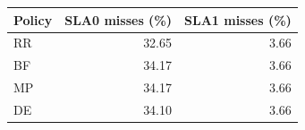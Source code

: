 \begin{tabular}{lrr}
\toprule
Policy & SLA0 misses (\%) & SLA1 misses (\%) \\
\midrule
RR & 32.65 & 3.66 \\
BF & 34.17 & 3.66 \\
MP & 34.17 & 3.66 \\
DE & 34.10 & 3.66 \\
\bottomrule
\end{tabular}
